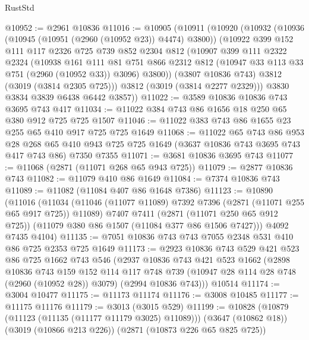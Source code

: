 \begin{lexlean}{RustStd}
\begin{coremodule}
@10952 := @2961 @10836
@11016 := @10905
    (@10911
      (@10920
        (@10932
          (@10936 (@10945 (@10951 (@2960 (@10952 @23)) @4474) @3800))
          (@10922
            @399
            @152
            @111
            @117
            @2326
            @725
            @739
            @852
            @2304
            @812
            (@10907
              @399
              @111
              @2322
              @2324
              (@10938
                @161
                @111
                @81
                @751
                @866
                @2312
                @812
                (@10947 @33 @113 @33 @751 (@2960 (@10952 @33)) @3096)
                @3800))
            (@3807 @10836 @743)
            @3812
            (@3019 (@3814 @2305 @725)))
          @3812
          (@3019 (@3814 @2277 @2329)))
        @3830
        @3834
        @3839
        @6438
        @6442
        @3857))
@11022 := @3589 @10836 @10836 @743 @3695 @743 @417
@11034 := @11022 @384 @743 @86 @1656 @18 @250 @65 @380 @912 @725 @725 @1507
@11046 := @11022 @383 @743 @86 @1655 @23 @255 @65 @410 @917 @725 @725 @1649
@11068 := @11022
    @65
    @743
    @86
    @953
    @28
    @268
    @65
    @410
    @943
    @725
    @725
    @1649
    (@3637 @10836 @743 @3695 @743 @417 @743 @86)
    @7350
    @7355
@11071 := @3681 @10836 @3695 @743
@11077 := @11068 (@2871 (@11071 @268 @65 @943 @725))
@11079 := @2877 @10836 @743
@11082 := @11079 @410 @86 @1649
@11084 := @7374 @10836 @743
@11089 := @11082 (@11084 @407 @86 @1648 @7386)
@11123 := @10890
    (@11016
      (@11034
        (@11046 (@11077 @11089) @7392 @7396 (@2871 (@11071 @255 @65 @917 @725)) @11089)
        @7407
        @7411
        (@2871 (@11071 @250 @65 @912 @725))
        (@11079 @380 @86 @1507 (@11084 @377 @86 @1506 @7427)))
      @4092
      @7435
      @4104)
@11135 := @7051 @10836 @743 @743 @7055 @2348 @531 @410 @86 @725 @2353 @725 @1649
@11173 := @2923
    @10836
    @743
    @529
    @421
    @523
    @86
    @725
    @1662
    @743
    @546
    (@2937
      @10836
      @743
      @421
      @523
      @1662
      (@2898
        @10836
        @743
        @159
        @152
        @114
        @117
        @748
        @739
        (@10947 @28 @114 @28 @748 (@2960 (@10952 @28)) @3079)
        (@2994 @10836 @743)))
    @10514
@11174 := @3004 @10477
@11175 := @11173 @11174
@11176 := @3008 @10485
@11177 := @11175 @11176
@11179 := @3013 (@3015 @529)
@11199 := @10828
    (@10879 (@11123 (@11135 (@11177 @11179 @3025) @11089)))
    (@3647 (@10862 @18))
    (@3019 (@10866 @213 @226))
    (@2871 (@10873 @226 @65 @825 @725))

\end{coremodule}
\end{lexlean}
